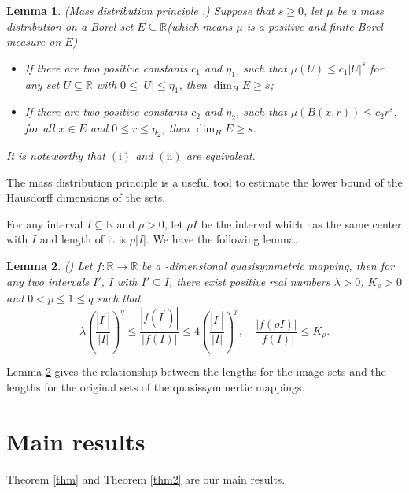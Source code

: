 \documentclass[reqno]{amsart}
\theoremstyle{plain}
\newtheorem{lem}{Lemma}
\theoremstyle{definition}
\theoremstyle{remark}
\numberwithin{equation}{section} \DeclareMathOperator\intr{int}
\begin{document}
\begin{lem}\label{l1}\textmd{\rm (Mass distribution principle \rm{\cite{wen00}},\rm{\cite{fkj97}})}
Suppose that $s\ge0$, let $\mu$ be a mass distribution  on a Borel set  $E\subseteq\mathbb{R}${\rm(}which means $\mu$ is a positive and finite Borel measure on $E${\rm)}\begin{itemize}
  \item[(i)]If there are two positive constants $c_1$ and $\eta_1$, such that
  $\mu(U)\le c_1\left | U \right |^{s}$ for any set $U\subseteq\mathbb{R}$ with $0\le\left | U \right | \le \eta_1$,
  then $\dim_{H}E\ge s$;
  \item[(ii)]If there are two positive constants $c_2$ and $\eta_2$, such that $\mu(B(x,r))\le c_2r^s$,
  for all $x\in E$ and $0\le r\le\eta_2$, then $\dim_{H}E\ge s$.

\end{itemize}


It is noteworthy that $\mathrm{(i)}$ and $\mathrm{(ii)}$ are equivalent.
\end{lem}
The mass distribution principle is a useful tool to estimate the lower bound of the Hausdorff dimensions of the sets.
\bigskip


For any interval $I\subseteq\mathbb{R}$ and $\rho>0$, let $\rho I$ be the interval which has the same center with $I$ and length of it is $\rho \left|I\right|$. We have the following lemma.


\begin{lem}\label{l2}{\rm{(\cite{wjm93})}}
Let $f:\mathbb{R}\to \mathbb{R}$ be a -dimensional quasisymmetric mapping, then
 for any two intervals $I'$, $I $ with $I'\subseteq I$,
 there exist positive real numbers $\lambda>0$, $K_{\rho}>0$ and $0<p\le 1\le q$ such that
	$$\lambda(\frac{|I^{'}|}{\left|I\right|})^{q}\le \frac{|f(I^{'})|}{\left|f(I)\right|}\le 4(\frac{|I^{'}|}{\left|I\right|})^{p},\quad
\frac{\left|f(\rho I)\right|}{\left|f(I)\right|}\le K_{\rho}.$$
\end{lem}
Lemma \ref{l2} gives the  relationship  between the lengths for the image sets  and the lengths for the original sets of the quasissymmertic mappings.

\bigskip

\section{Main results}
Theorem \ref{thm} and Theorem \ref{thm2} are our main results.
\end{document}
